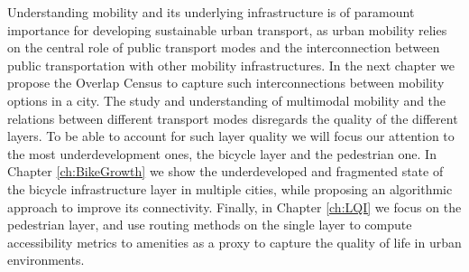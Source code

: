 Understanding mobility and its underlying infrastructure is of paramount importance for developing sustainable urban transport, as urban mobility relies on the central role of public transport modes and the interconnection between public transportation with other mobility infrastructures. In the next chapter we propose the Overlap Census to capture such interconnections between mobility options in a city. The study and understanding of multimodal mobility and the relations between different transport modes disregards the quality of the different layers. To be able to account for such layer quality we will focus our attention to the most underdevelopment ones, the bicycle layer and the pedestrian one. In Chapter \ref{ch:BikeGrowth} we show the underdeveloped and fragmented state of the bicycle infrastructure layer in multiple cities, while proposing an algorithmic approach to improve its connectivity. Finally, in Chapter \ref{ch:LQI} we focus on the pedestrian layer, and use routing methods on the single layer to compute accessibility metrics to amenities as a proxy to capture the quality of life in urban environments.